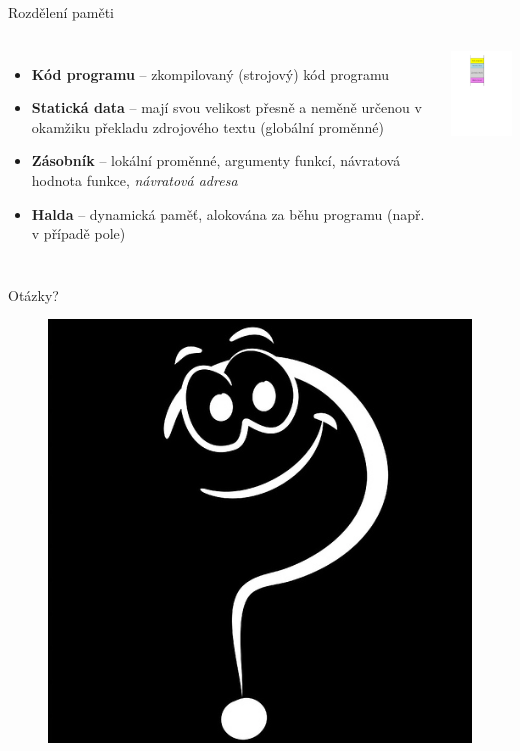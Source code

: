 \documentclass[14pt,aspectratio=169]{beamer}
\begin{document}
    \begin{frame}[t]{Rozdělení paměti}
        \begin{columns}[onlytextwidth,T]
            \column{\dimexpr\linewidth-30mm-3mm}
            \begin{itemize}
                \item \textbf{Kód programu} -- zkompilovaný (strojový) kód programu
                \item \textbf{Statická data} -- mají svou velikost přesně a neměně určenou v okamžiku překladu zdrojového textu (globální proměnné)
                \item \textbf{Zásobník} -- lokální proměnné, argumenty funkcí, návratová hodnota funkce, \emph{návratová adresa}
                \item \textbf{Halda} -- dynamická paměť, alokována za běhu programu (např. v případě pole)
            \end{itemize}
      
            \column{30mm}
            \includegraphics[width=30mm]{images/program_v_pameti.pdf}
        \end{columns}
    \end{frame}

    \begin{frame}{Otázky?}
        \begin{figure}
            \centering
            \includegraphics[scale=.4]{images/discussion_inverted.png}
        \end{figure}
    \end{frame}
\end{document}
